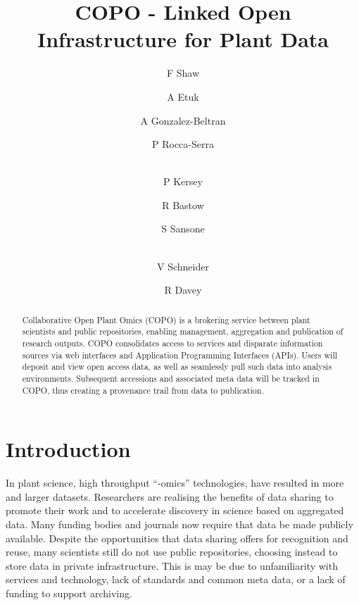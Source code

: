 \documentclass[runningheads,a4paper]{llncs}
\begin{document}
\title{COPO - Linked Open Infrastructure for Plant Data}

\author{F Shaw  \and A Etuk  \and A Gonzalez-Beltran
  \and P Rocca-Serra \and\\
  P  Kersey \and R Bastow  \and S Sansone \and\\
  V Schneider \and R Davey }
%


\maketitle

\vspace*{-0.2in}
\begin{abstract}
Collaborative Open Plant Omics (COPO) is a brokering
  service between plant scientists and public repositories, enabling management, aggregation and publication of research
  outputs. COPO consolidates access to services and disparate
  information sources via web interfaces and Application Programming
  Interfaces (APIs). Users will deposit and view open
  access data, as well as seamlessly pull such data into analysis environments. Subsequent accessions and associated meta data will be tracked in COPO, thus creating a provenance trail from data to publication.
\end{abstract}

\vspace*{-0.3in}
\section{Introduction}

In plant science, high
throughput “-omics” technologies, have resulted in more and larger
datasets. Researchers are realising the benefits of data sharing to promote their work and to accelerate discovery in
science based on aggregated data. Many funding bodies and journals now
require that data be made publicly available. Despite the
opportunities that data sharing offers for recognition and reuse, many
scientists still do not use public repositories, choosing instead to store data in private infrastructure. This is may be due to unfamiliarity with services and technology, lack of standards and common meta data, or a lack of funding to
support archiving.
\end{document}
